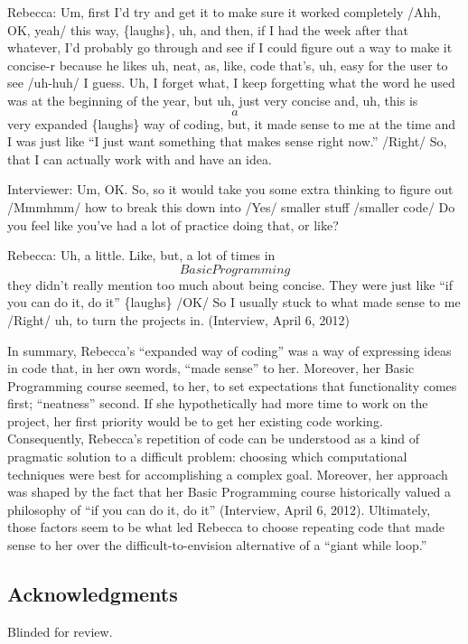 Rebecca: Um, first I'd try and get it to make sure it worked completely /Ahh, OK, yeah/ this way, \{laughs\}, uh, and then, if I had the week after that whatever, I'd probably go through and see if I could figure out a way to make it concise-r because he likes uh, neat, as, like, code that's, uh, easy for the user to see /uh-huh/ I guess. Uh, I forget what, I keep forgetting what the word he used was at the beginning of the year, but uh, just very concise and, uh, this is \[a\] very expanded \{laughs\} way of coding, but, it made sense to me at the time and I was just like ``I just want something that makes sense right now.'' /Right/ So, that I can actually work with and have an idea.

Interviewer: Um, OK. So, so it would take you some extra thinking to figure out /Mmmhmm/ how to break this down into /Yes/ smaller stuff /smaller code/ Do you feel like you've had a lot of practice doing that, or like?

Rebecca: Uh, a little. Like, but, a lot of times in \[Basic Programming\] they didn't really mention too much about being concise. They were just like ``if you can do it, do it'' \{laughs\} /OK/ So I usually stuck to what made sense to me /Right/ uh, to turn the projects in. (Interview, April 6, 2012)

In summary, Rebecca's ``expanded way of coding'' was a way of expressing ideas in code that, in her own words, ``made sense'' to her. Moreover, her Basic Programming course seemed, to her, to set expectations that functionality comes first; ``neatness'' second. If she hypothetically had more time to work on the project, her first priority would be to get her existing code working. Consequently, Rebecca's repetition of code can be understood as a kind of pragmatic solution to a difficult problem: choosing which computational techniques were best for accomplishing a complex goal. Moreover, her approach was shaped by the fact that her Basic Programming course historically valued a philosophy of ``if you can do it, do it'' (Interview, April 6, 2012). Ultimately, those factors seem to be what led Rebecca to choose repeating code that made sense to her over the difficult-to-envision alternative of a ``giant while loop.''


\subsection{Acknowledgments}\label{acknowledgments}

Blinded for review.

\clearpage



